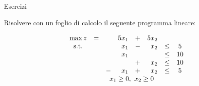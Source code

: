 \documentclass{beamer}
\begin{document}
\generatitolo

\def\rombo{$$
\begin{array}{cccrcrcc}
	\max z	&=	& 	&5 x_{1}	&+&5 x_{2}\\
	\mbox{s.t.}	&	& & x_{1}	&-& x_{2}	&\leq	& 5\\
				&	& & x_{1}	& &     	&\leq	&10\\
				&	& &			&+& x_{2}	&\leq	&10\\
				&	&-& x_{1}	&+& x_{2}	&\leq	& 5\\
	&	&\multicolumn{4}{c}{x_{1} \geq 0,\ x_{2}\geq 0}
\end{array}
$$}

\begin{frame}%
{Esercizi}

Risolvere con un foglio di calcolo il seguente programma lineare:

\begin{enumerate}
{\footnotesize \item \rombo}
\end{enumerate}

\end{frame}
\end{document}
